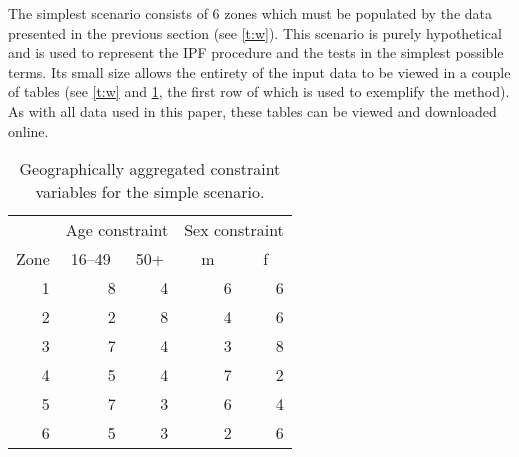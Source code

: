 \documentclass[a4paper,10pt]{article}
\begin{document}
The simplest scenario consists of 6 zones which
must be populated by the
data presented in the previous section (see \cref{t:w}).
This scenario is purely hypothetical and is used to represent the IPF procedure
and the tests in the simplest possible terms. Its small size allows the entirety
of the input data to be viewed in a couple of tables
(see \cref{t:w} and \cref{t2}, the first row of which is used
to exemplify the method). As with all
data used in this paper, these tables can be
viewed and downloaded online.


\begin{table}[htbp]
\caption{Geographically aggregated constraint variables for the simple
scenario.}
\begin{center}
\begin{tabular}{rrrrr}
\toprule
\multicolumn{1}{l}{} & \multicolumn{2}{c}{Age constraint} & \multicolumn{2}{c}{Sex constraint} \\
\multicolumn{1}{l}{Zone} & \multicolumn{1}{c}{16--49} & \multicolumn{1}{c}{50+} & \multicolumn{1}{c}{m} & \multicolumn{1}{c}{f} \\
\midrule
1 & 8 & 4 & 6 & 6 \\
2 & 2 & 8 & 4 & 6 \\
3 & 7 & 4 & 3 & 8 \\
4 & 5 & 4 & 7 & 2 \\
5 & 7 & 3 & 6 & 4 \\
6 & 5 & 3 & 2 & 6 \\
\bottomrule
\end{tabular}
\end{center}
\label{t2}
\end{table}
\end{document}
